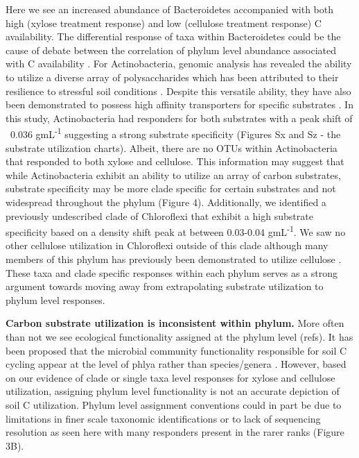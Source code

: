 Here we see an increased abundance of Bacteroidetes accompanied with both high (xylose treatment response) and low (cellulose treatment response) C availability. The differential response of taxa within Bacteroidetes could be the cause of debate between the correlation of phylum level abundance associated with C availability \cite{Fierer_2007,Rui_2009,Sharp_2000,L_pez_Lozano_2013,Bastian_2009}. For Actinobacteria, genomic analysis has revealed the ability to utilize a diverse array of polysaccharides which has been attributed to their resilience to stressful soil conditions \cite{Trivedi_2013}. Despite this versatile ability, they have also been demonstrated to possess high affinity transporters for specific substrates \cite{Trivedi_2013}. In this study, Actinobacteria had responders for both substrates with a peak shift of ~0.036 gmL\textsuperscript{-1} suggesting a strong substrate specificity (Figures Sx and Sz - the substrate utilization charts). Albeit, there are no OTUs within Actinobacteria that responded to both xylose and cellulose. This information may suggest that while Actinobacteria exhibit an ability to utilize an array of carbon substrates, substrate specificity may be more clade specific for certain substrates and not widespread throughout the phylum (Figure 4). Additionally, we identified a previously undescribed clade of Chloroflexi that exhibit a high substrate specificity based on a density shift peak at between 0.03-0.04 gmL\textsuperscript{-1}.  We saw no other cellulose utilization in Chloroflexi outside of this clade although many members of this phylum has previously been demonstrated to utilize cellulose \cite{Goldfarb_2011,Cole_2013,Hug_2013}. These taxa and clade specific responses within each phylum serves as a strong argument towards moving away from extrapolating substrate utilization to phylum level responses.       

\textbf{Carbon substrate utilization is inconsistent within phylum.} More often than not we see ecological functionality assigned at the phylum level (refs). It has been proposed that the microbial community functionality responsible for soil C cycling appear at the level of phlya rather than species/genera \cite{Schimel_2012}. However, based on our evidence of clade or single taxa level responses for xylose and cellulose utilization, assigning phylum level functionality is not an accurate depiction of soil C utilization. Phylum level assignment conventions could in part be due to limitations in finer scale taxonomic identifications or to lack of sequencing resolution as seen here with many responders present in the rarer ranks (Figure 3B). 

